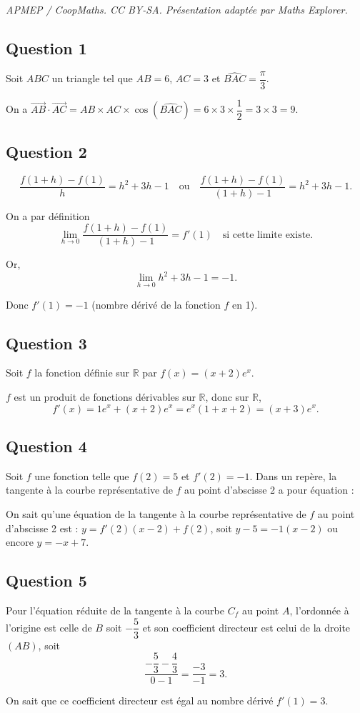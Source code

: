 \documentclass[10pt]{article}
\begin{document}
\noindent\textit{APMEP / CoopMaths. CC BY-SA. Présentation adaptée par Maths Explorer.}\par\medskip
\subsection*{Question 1}
	
	Soit \(ABC\) un triangle tel que \(AB = 6\), \(AC = 3\) et \(\widehat{ BAC} = \dfrac{\pi}{3}\).
	
	On a \(\overrightarrow{AB} \cdot \overrightarrow{AC} = AB \times AC \times \cos(\widehat{BAC}) = 6 \times 3 \times \dfrac{1}{2} = 3 \times 3 = 9\).
	
	\subsection*{Question 2}
	
	\[
	\dfrac{f(1+h) - f(1)}{h} = h^2 + 3h - 1 \quad \text{ou} \quad \dfrac{f(1+h) - f(1)}{(1+h)-1} = h^2 + 3h - 1.
	\]
	
	On a par définition
	\[
	\lim_{h \to 0} \dfrac{f(1+h) - f(1)}{(1+h)-1} = f'(1) \quad \text{si cette limite existe}.
	\]
	
	Or,
	\[
	\lim_{h \to 0} h^2 + 3h - 1 = -1.
	\]
	
	Donc \(f'(1) = -1\) (nombre dérivé de la fonction \(f\) en 1).
	
	\subsection*{Question 3}
	
	Soit \(f\) la fonction définie sur \(\mathbb{R}\) par \(f(x) = (x + 2)e^x\).
	
	\(f\) est un produit de fonctions dérivables sur \(\mathbb{R}\), donc sur \(\mathbb{R}\),
	\[
	f'(x) = 1e^x + (x + 2)e^x = e^x (1 + x + 2) = (x + 3)e^x.
	\]
	
	\subsection*{Question 4}
	
	Soit \(f\) une fonction telle que \(f(2) = 5\) et \(f'(2) = -1\). Dans un repère, la tangente à la courbe représentative de \(f\) au point d’abscisse 2 a pour équation :
	
	On sait qu’une équation de la tangente à la courbe représentative de \(f\) au point d’abscisse 2 est :
$y  = f'(2)(x - 2)+f(2)$, soit  $y - 5 = -1(x - 2)$ ou encore $y = -x + 7$.
	
	
	\subsection*{Question 5}
	
	
	Pour l’équation réduite de la tangente à la courbe \(C_f\) au point \(A\), l’ordonnée à l’origine est celle de \(B\) soit \(-\dfrac{5}{3}\) et son coefficient directeur est celui de la droite \((AB)\), soit
	\[
	\dfrac{-\dfrac{5}{3} - \dfrac{4}{3}}{0 - 1} = \dfrac{-3}{-1} = 3.
	\]
	
	On sait que ce coefficient directeur est égal au nombre dérivé \(f'(1) = 3\).
\end{document}
